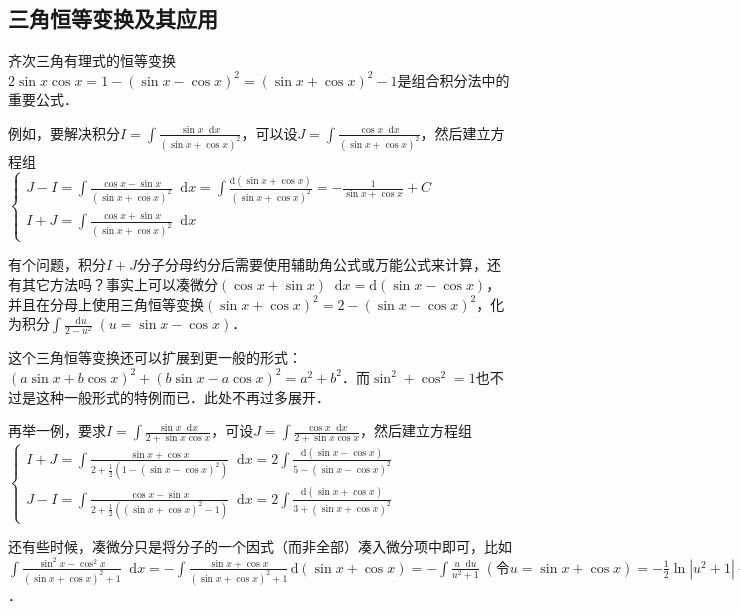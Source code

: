 \documentclass{ctexbook}
\newcommand*{\dif}{\mathop{}\!\mathrm{d}}
\begin{document}
\subsection{三角恒等变换及其应用}
齐次三角有理式的恒等变换$2\sin{x}\cos{x}=1-\left(\sin{x}-\cos{x}\right)^{2}=\left(\sin{x}+\cos{x}\right)^{2}-1$是组合积分法中的重要公式．\par
例如，要解决积分$I=\int\frac{\sin{x}\dif{x}}{\left(\sin{x}+\cos{x}\right)^{2}}$，可以设$J=\int\frac{\cos{x}\dif{x}}{\left(\sin{x}+\cos{x}\right)^{2}}$，然后建立方程组\\
$\begin{cases}J-I=\int\frac{\cos{x}-\sin{x}}{\left(\sin{x}+\cos{x}\right)^{2}}\dif{x}=\int\frac{\mathrm{d}\left(\sin{x}+\cos{x}\right)}{\left(\sin{x}+\cos{x}\right)^{2}}=-\frac{1}{\sin{x}+\cos{x}}+C\\I+J=\int\frac{\cos{x}+\sin{x}}{\left(\sin{x}+\cos{x}\right)^{2}}\dif{x}\end{cases}$\par
有个问题，积分$I+J$分子分母约分后需要使用辅助角公式或万能公式来计算，还有其它方法吗？事实上可以凑微分$\left(\cos{x}+\sin{x}\right)\dif{x}=\mathrm{d}\left(\sin{x}-\cos{x}\right)$，并且在分母上使用三角恒等变换$\left(\sin{x}+\cos{x}\right)^{2}=2-\left(\sin{x}-\cos{x}\right)^{2}$，化为积分$\int\frac{\dif{u}}{2-u^{2}}\;\left(u=\sin{x}-\cos{x}\right)$．\par
这个三角恒等变换还可以扩展到更一般的形式：$\left(a\sin{x}+b\cos{x}\right)^{2}+\left(b\sin{x}-a\cos{x}\right)^{2}=a^{2}+b^{2}$．而$\sin^{2}+\cos^{2}=1$也不过是这种一般形式的特例而已．此处不再过多展开．\par
再举一例，要求$I=\int\frac{\sin{x}\dif{x}}{2+\sin{x}\cos{x}}$，可设$J=\int\frac{\cos{x}\dif{x}}{2+\sin{x}\cos{x}}$，然后建立方程组\\
$\begin{cases}I+J=\int\frac{\sin{x}+\cos{x}}{2+\frac{1}{2}\left(1-\left(\sin{x}-\cos{x}\right)^{2}\right)}\dif{x}=2\int\frac{\mathrm{d}\left(\sin{x}-\cos{x}\right)}{5-\left(\sin{x}-\cos{x}\right)^{2}}\\J-I=\int\frac{\cos{x}-\sin{x}}{2+\frac{1}{2}\left(\left(\sin{x}+\cos{x}\right)^{2}-1\right)}\dif{x}=2\int\frac{\mathrm{d}\left(\sin{x}+\cos{x}\right)}{3+\left(\sin{x}+\cos{x}\right)^{2}}\end{cases}$\par
还有些时候，凑微分只是将分子的一个因式（而非全部）凑入微分项中即可，比如$\int\frac{\sin^{2}{x}-\cos^{2}{x}}{\left(\sin{x}+\cos{x}\right)^{2}+1}\dif{x}=-\int\frac{\sin{x}+\cos{x}}{\left(\sin{x}+\cos{x}\right)^{2}+1}\,\mathrm{d}\left(\sin{x}+\cos{x}\right)=-\int\frac{u\dif{u}}{u^{2}+1}\;\left(\text{令}u=\sin{x}+\cos{x}\right)=-\frac{1}{2}\ln{|u^{2}+1|}+C$．\par
\end{document}

